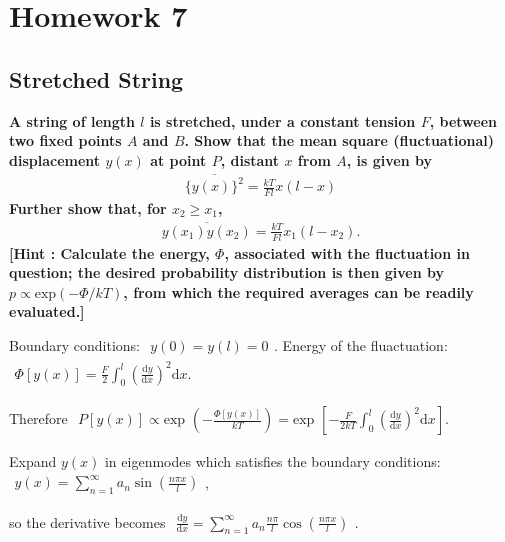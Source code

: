 \documentclass[../../main.tex]{subfiles}
\begin{document}
\section{Homework 7}

\subsection{Stretched String}

\textbf{A string of length $l$ is stretched, under a constant tension $F$, between two fixed points $A$ and $B$. Show that the mean square (fluctuational) displacement $y(x)$ at point $P$, distant $x$ from $A$, is given by
  \begin{align*}
    \overline{\{y(x)\}^{2}} = \frac{kT}{Fl}x(l-x)
  \end{align*}
  Further show that, for $x_{2}\geq x_{1}$,
  \begin{align*}
    \overline{y(x_{1})y(x_{2})} = \frac{kT}{Fl}x_{1}(l-x_{2}).
  \end{align*}
  [Hint : Calculate the energy, $\Phi$, associated with the fluctuation in question; the desired probability distribution is then given by $p\propto \text{exp}(-\Phi/kT)$, from which the required averages can be readily evaluated.]}

  Boundary conditions: $\begin{aligned}
    y(0) = y(l) = 0
  \end{aligned}$. Energy of the fluactuation: $\begin{aligned}
    \Phi[y(x)] = \frac{F}{2}\int_{0}^{l}\left(\frac{\mathrm{d}y}{\mathrm{d}x}\right)^{2}\mathrm{d}x.
  \end{aligned}$

  Therefore $\begin{aligned}
    P[y(x)]\propto \text{exp }\left(-\frac{\Phi[y(x)]}{kT}\right) = \text{exp }\left[-\frac{F}{2kT}\int_{0}^{l}\left(\frac{\mathrm{d}y}{\mathrm{d}x}\right)^{2}\mathrm{d}x\right].
  \end{aligned}$

  Expand $y(x)$ in eigenmodes which satisfies the boundary conditions: $\begin{aligned}
    y(x) = \sum_{n=1}^{\infty}a_{n}\sin{\left(\frac{n\pi x}{l}\right)}
  \end{aligned}$, 
  
  so the derivative becomes $\begin{aligned}
    \frac{\mathrm{d}y}{\mathrm{d}x} = \sum_{n=1}^{\infty}a_{n}\frac{n\pi}{l}\cos{\left(\frac{n\pi x}{l}\right)}
  \end{aligned}$. 
  
\end{document}
